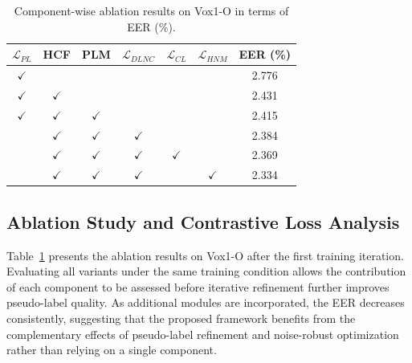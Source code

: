 \documentclass[lettersize,journal]{IEEEtran}
\begin{document}
\begin{table}[!t] %
    \centering
    \caption{Component-wise ablation results on Vox1-O in terms of EER (\%).} %
    \setlength{\tabcolsep}{6.5pt} %
    \begin{tabular}{c c c c c c c} %
        \hline
        $\mathcal{L}_{PL}$ & HCF & PLM & $\mathcal{L}_{DLNC}$  & $\mathcal{L}_{CL}$ & $\mathcal{L}_{HNM}$ & EER (\%)\\
        \hline
        $\checkmark$ & & & & & & 2.776  \\  
        $\checkmark$ & $\checkmark$ & & & & & 2.431\\
        $\checkmark$ & $\checkmark$  & $\checkmark$ & & & & 2.415\\
        &$\checkmark$ & $\checkmark$  & $\checkmark$ & & & 2.384\\
        &$\checkmark$ & $\checkmark$  & $\checkmark$ &$\checkmark$ & & 2.369\\
        &$\checkmark$ & $\checkmark$  & $\checkmark$ & &$\checkmark$ & 2.334\\
        \hline
    \end{tabular}
    \label{tab:ablation}
\end{table}
\FloatBarrier





\subsection{Ablation Study and Contrastive Loss Analysis}

Table~\ref{tab:ablation} presents the ablation results on Vox1-O after the first training iteration. Evaluating all variants under the same training condition allows the contribution of each component to be assessed before iterative refinement further improves pseudo-label quality. As additional modules are incorporated, the EER decreases consistently, suggesting that the proposed framework benefits from the complementary effects of pseudo-label refinement and noise-robust optimization rather than relying on a single component.
\end{document}
